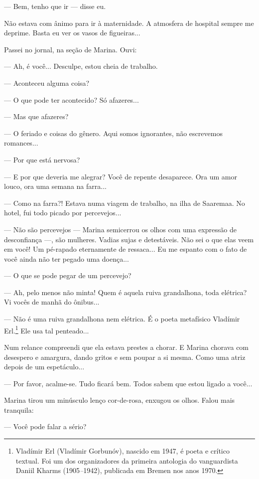 --- Bem, tenho que ir --- disse eu.

Não estava com ânimo para ir à maternidade. A atmosfera de hospital
sempre me deprime. Basta eu ver os vasos de figueiras...

Passei no jornal, na seção de Marina. Ouvi:

--- Ah, é você... Desculpe, estou cheia de trabalho.

--- Aconteceu alguma coisa?

--- O que pode ter acontecido? Só afazeres...

--- Mas que afazeres?

--- O feriado e coisas do gênero. Aqui somos ignorantes, não escrevemos
romances...

--- Por que está nervosa?

--- E por que deveria me alegrar? Você de repente desaparece. Ora um
amor louco, ora uma semana na farra...

--- Como na farra?! Estava numa viagem de trabalho, na ilha de Saaremaa.
No hotel, fui todo picado por percevejos...

--- Não são percevejos --- Marina semicerrou os olhos com uma expressão
de desconfiança ---, são mulheres. Vadias sujas e detestáveis. Não sei o
que elas veem em você! Um pé-rapado eternamente de ressaca... Eu me
espanto com o fato de você ainda não ter pegado uma doença...

--- O que se pode pegar de um percevejo?

--- Ah, pelo menos não minta! Quem é aquela ruiva grandalhona, toda
elétrica? Vi vocês de manhã do ônibus...

--- Não é uma ruiva grandalhona nem elétrica. É o poeta metafísico
Vladímir Erl.\footnote{Vladímir Erl (Vladímir Gorbunóv), nascido em
  1947, é poeta e crítico textual. Foi um dos organizadores da primeira
  antologia do vanguardista Daniil Kharms (1905\emph{--}1942), publicada
  em Bremen nos anos 1970.} Ele usa tal penteado...

Num relance compreendi que ela estava prestes a chorar. E Marina chorava
com desespero e amargura, dando gritos e sem poupar a si mesma. Como uma
atriz depois de um espetáculo...

--- Por favor, acalme-se. Tudo ficará bem. Todos sabem que estou ligado
a você...

Marina tirou um minúsculo lenço cor-de-rosa, enxugou os olhos. Falou
mais tranquila:

--- Você pode falar a sério?

